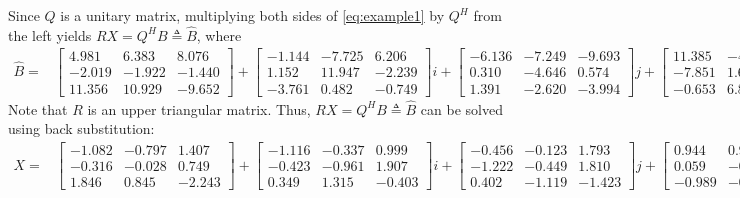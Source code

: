 \documentclass[3p]{elsarticle}
\numberwithin{equation}{section}
\begin{document}
Since $Q$ is a unitary matrix, multiplying both sides of \eqref{eq:example1} by $Q^H$ from the left yields $RX = Q^HB\triangleq \widehat{B}$,
where
{\footnotesize
\begin{align*}
  \widehat{B} =
    & \begin{bmatrix}
     4.981  &  6.383  &  8.076 \\
    -2.019  & -1.922  & -1.440 \\
     11.356 &  10.929 & -9.652
    \end{bmatrix} +
    \begin{bmatrix}
    -1.144 & -7.725  &  6.206 \\
     1.152 &  11.947 & -2.239 \\
    -3.761 &  0.482  & -0.749
    \end{bmatrix} i +
    \begin{bmatrix}
    -6.136 & -7.249 & -9.693 \\
     0.310 & -4.646 &  0.574 \\
     1.391 & -2.620 & -3.994
    \end{bmatrix} j +
    \begin{bmatrix}
     11.385 & -4.261 & -2.859 \\
    -7.851  &  1.655 & -0.404 \\
    -0.653  &  6.826 &  12.841
    \end{bmatrix} k.
\end{align*}
}
Note that $R$ is an upper triangular matrix. Thus, $RX = Q^HB\triangleq \widehat{B}$ can be solved using back substitution:
{\footnotesize
 \begin{align*}
  X =
    & \begin{bmatrix}
    -1.082 & -0.797 &  1.407 \\
    -0.316 & -0.028 &  0.749 \\
     1.846 &  0.845 & -2.243
    \end{bmatrix} +
    \begin{bmatrix}
    -1.116 & -0.337 &  0.999 \\
    -0.423 & -0.961 &  1.907 \\
     0.349 &  1.315 & -0.403
    \end{bmatrix} i +
    \begin{bmatrix}
    -0.456 & -0.123 &  1.793 \\
    -1.222 & -0.449 &  1.810 \\
     0.402 & -1.119 & -1.423
    \end{bmatrix} j +
    \begin{bmatrix}
     0.944 &  0.982 & -1.597 \\
     0.059 & -0.514 &  0.229 \\
    -0.989 & -0.256 &  2.156
    \end{bmatrix} k.
\end{align*}
}
\end{document}
